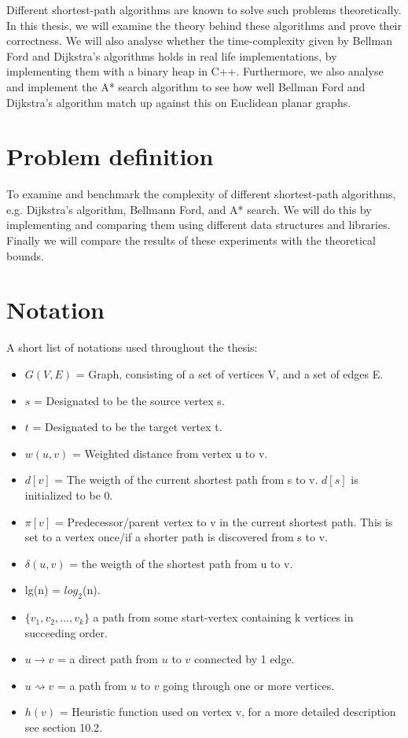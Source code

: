 \documentclass[11pt]{article}
\begin{document}
\noindent Different shortest-path algorithms are known to solve such problems theoretically. In this thesis, we will examine the theory behind these algorithms and prove their correctness. We will also analyse whether the time-complexity given by Bellman Ford and Dijkstra's algorithms holds in real life implementations, by implementing them with a binary heap in C++. Furthermore, we also analyse and implement the A* search algorithm to see how well Bellman Ford and Dijkstra's algorithm match up against this on Euclidean planar graphs.\\

\section{Problem definition}
To examine and benchmark the complexity of different shortest-path algorithms, e.g. Dijkstra's algorithm, Bellmann Ford, and A* search. We will do this by implementing and comparing them using different data structures and libraries. Finally we will compare the results of these experiments with the theoretical bounds.

\section{Notation}
A short list of notations used throughout the thesis:
\begin{itemize}
\item $G(V,E)$ = Graph, consisting of a set of vertices V, and a set of edges E.
\item $s$ = Designated to be the source vertex s.
\item $t$ = Designated to be the target vertex t.
\item $w(u,v)$ = Weighted distance from vertex u to v.
\item $d[v]$ = The weigth of the current shortest path from s to v. $d[s]$ is initialized to be 0.
\item $\pi[v]$ = Predecessor/parent vertex to v in the current shortest path. This is set to a vertex once/if a shorter path is discovered from s to v.
\item $\delta(u,v)$ = the weigth of the shortest path from u to v.
\item lg(n) = $log_{2}$(n).
\item $\{v_{1}, v_{2}, ..., v_{k}\}$ a path from some start-vertex containing k vertices in succeeding order.
\item $u \rightarrow v$ = a direct path from $u$ to $v$ connected by 1 edge.
\item $u \rightsquigarrow v$ = a path from $u$ to $v$ going through one or more vertices.
\item $h(v)$ = Heuristic function used on vertex v, for a more detailed description see section 10.2.
\end{itemize}
\end{document}
